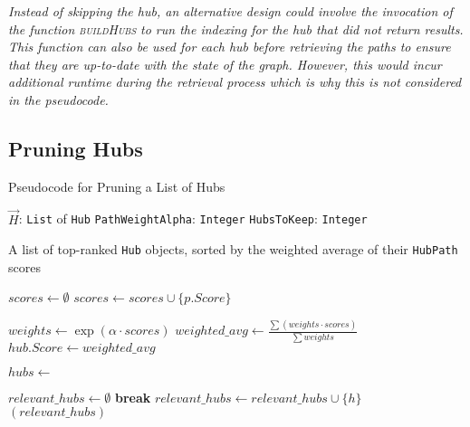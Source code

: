 \textit{Instead of skipping the hub, an alternative design could involve the invocation of the function \textsc{buildHubs} to run the indexing for the hub that did not return results. This function can also be used for each hub before retrieving the paths to ensure that they are up-to-date with the state of the graph. However, this would incur additional runtime during the retrieval process which is why this is not considered in the pseudocode. }


\subsection{Pruning Hubs}


\begin{algorithm}[t]
\caption{Pseudocode for Pruning a List of Hubs}
\label{alg:prune_hubs}
\begin{algorithmic}[1]
\Require
    \Statex $\vec{H}$: \texttt{List} of \texttt{Hub} 
    \Statex \texttt{PathWeightAlpha}: \texttt{Integer} 
    \Statex \texttt{HubsToKeep}: \texttt{Integer} 

\Ensure 
    \Statex A list of top-ranked \texttt{Hub} objects, sorted by the weighted average of their \texttt{HubPath} scores

\Statex
{}
        \State $scores \gets \emptyset$ 
            \State $scores \gets scores \cup \{p.Score\}$
        \EndFor
        
        \State $weights \gets \exp(\alpha \cdot scores)$ 
        \State $weighted\_avg \gets \frac{\sum (weights \cdot scores)}{\sum weights}$
        \State $hub.Score \gets weighted\_avg$
    \EndFor

    \State $hubs \gets$  

    \State $relevant\_hubs \gets \emptyset$ 
            \State \textbf{break} 
        \EndIf
        \State $relevant\_hubs \gets relevant\_hubs \cup \{h\}$
    \EndFor
    \State \Return $(relevant\_hubs)$
\EndFunction
\Statex
\end{algorithmic}

\end{algorithm}

